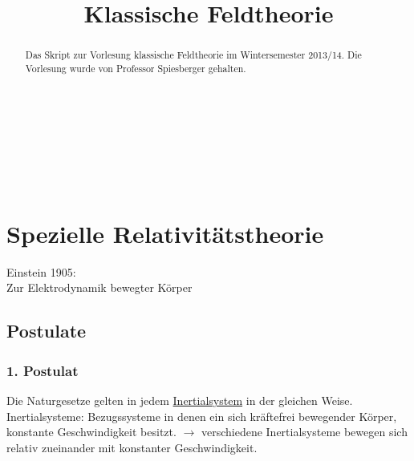 \documentclass[a4paper]{article}
\title{Klassische Feldtheorie}
\author{}
\date{}
\begin{document}
\maketitle
\begin{verbatim}






\end{verbatim}
\begin{abstract}
Das Skript zur Vorlesung klassische Feldtheorie im Wintersemester 2013/14. Die
Vorlesung wurde von Professor Spiesberger gehalten.
\end{abstract}
\newpage
\tableofcontents
\setcounter{tocdepth}{5}
\newpage

\section{Spezielle Relativitätstheorie}

Einstein 1905:\\
Zur Elektrodynamik bewegter Körper

\subsection{Postulate}
\subsubsection{1. Postulat}
Die Naturgesetze gelten in jedem
\underline{Inertialsystem} in der gleichen Weise.\\
Inertialsysteme: Bezugssysteme in denen ein sich kräftefrei bewegender Körper,
konstante Geschwindigkeit besitzt.
$\rightarrow$ verschiedene Inertialsysteme bewegen sich relativ zueinander mit
konstanter Geschwindigkeit.
\end{document}
